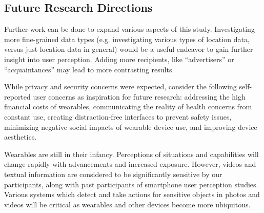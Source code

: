 \subsection{Future Research Directions}
Further work can be done to expand various aspects of this study. Investigating more fine-grained data types (e.g. investigating various types of location data, versus just location data in general) would be a useful endeavor to gain further insight into user perception. Adding more recipients, like ``advertisers'' or ``acquaintances'' may lead to more contrasting results.  

While privacy and security concerns were expected, consider the following self-reported user concerns as inspiration for future research: addressing the high financial costs of wearables, communicating the reality of health concerns from constant use, creating distraction-free interfaces to prevent safety issues, minimizing negative social impacts of wearable device use, and improving device aesthetics.  

Wearables are still in their infancy. Perceptions of situations and capabilities will change rapidly with advancements and increased exposure. However, videos and textual information are considered to be significantly sensitive by our participants, along with past participants of smartphone user perception studies. Various systems which detect and take actions for sensitive objects in photos and videos will be critical as wearables and other devices become more ubiquitous.